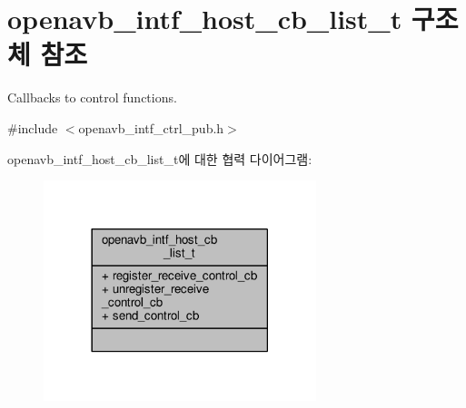 \hypertarget{structopenavb__intf__host__cb__list__t}{}\section{openavb\+\_\+intf\+\_\+host\+\_\+cb\+\_\+list\+\_\+t 구조체 참조}
\label{structopenavb__intf__host__cb__list__t}


Callbacks to control functions.  




{\ttfamily \#include $<$openavb\+\_\+intf\+\_\+ctrl\+\_\+pub.\+h$>$}



openavb\+\_\+intf\+\_\+host\+\_\+cb\+\_\+list\+\_\+t에 대한 협력 다이어그램\+:
\nopagebreak
\begin{figure}[H]
\begin{center}
\leavevmode
\includegraphics[width=225pt]{structopenavb__intf__host__cb__list__t__coll__graph}
\end{center}
\end{figure}
